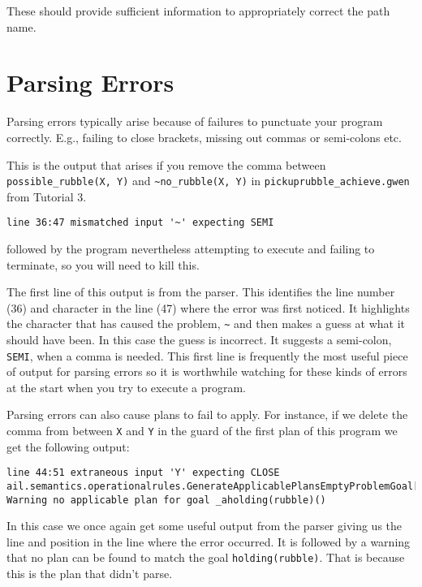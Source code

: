 These should provide sufficient information to appropriately correct
the path name. 

\section{Parsing Errors}

Parsing errors typically arise because of failures to punctuate your
program correctly.  E.g., failing to close brackets, missing out
commas or semi-colons etc. 

This is the output that arises if you remove the comma between
\lstinline{possible_rubble(X, Y)} and \lstinline{~no_rubble(X, Y)} in
\texttt{pickuprubble\_achieve.gwen} from Tutorial 3. 

\begin{verbatim}
line 36:47 mismatched input '~' expecting SEMI
\end{verbatim}
followed by the program nevertheless attempting to execute and failing to terminate, so you will need to kill this.

The first line of this output is from the parser.  This identifies the
line number (36) and character in the line (47) where the error was
first noticed.  It highlights the character that has caused the
problem, \texttt{\~} and then makes a guess at what it should have
been.  In this case the guess is incorrect.  It suggests a semi-colon,
\texttt{SEMI}, when a comma is needed.  This first line is frequently
the most useful piece of output for parsing
errors so it is worthwhile watching for these kinds of errors at the start when you try to execute a program. 

Parsing errors can also cause plans to fail to apply.  For instance, if we delete the comma from between
\texttt{X} and \texttt{Y} in the guard of the first plan of this
program we get the following output: 

\begin{verbatim}
line 44:51 extraneous input 'Y' expecting CLOSE
ail.semantics.operationalrules.GenerateApplicablePlansEmptyProblemGoal[WARNING|main|3:19:44]: 
Warning no applicable plan for goal _aholding(rubble)() 
\end{verbatim}

In this case we once again get some useful output from the parser
giving us the line and position in the line where the error occurred.
It is followed by a warning that no plan can be found to match the
goal \texttt{holding(rubble)}.  That is because this is the plan that
didn't parse. 

